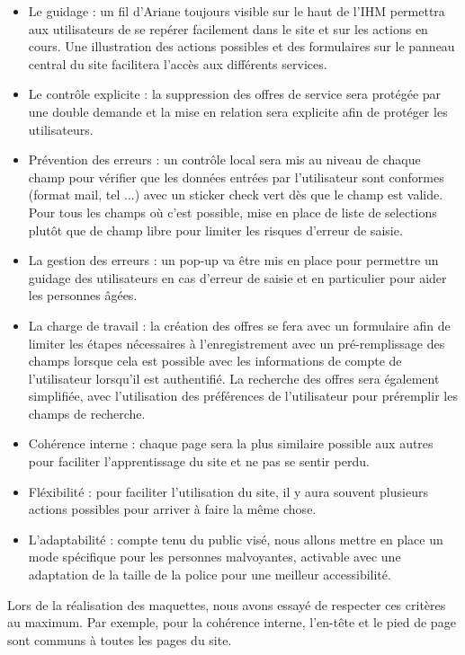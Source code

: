 \documentclass[a4paper,11pt]{article}
\begin{document}
\begin{itemize}
  \item Le guidage : un fil d’Ariane toujours visible sur le haut de l’IHM permettra aux utilisateurs de
  se repérer facilement dans le site et sur les actions en cours. Une illustration des actions
  possibles et des formulaires sur le panneau central du site facilitera l’accès aux différents
  services.
  \item Le contrôle explicite : la suppression des offres de service sera protégée par une double
  demande et la mise en relation sera explicite afin de protéger les utilisateurs.
  \item Prévention des erreurs : un contrôle local sera mis au niveau de chaque champ pour vérifier que
  les données entrées par l'utilisateur sont conformes (format mail, tel ...) avec un sticker check vert
  dès que le champ est valide. Pour tous les champs où c'est possible, mise en place de liste de selections
  plutôt que de champ libre pour limiter les risques d'erreur de saisie.
  \item La gestion des erreurs : un pop-up va être mis en place pour permettre un guidage des
  utilisateurs en cas d’erreur de saisie et en particulier pour aider les personnes âgées.
  \item La charge de travail : la création des offres se fera avec un formulaire afin de limiter les étapes
  nécessaires à l’enregistrement avec un pré-remplissage des champs lorsque cela est possible
  avec les informations de compte de l’utilisateur lorsqu’il est authentifié. La recherche des
  offres sera également simplifiée, avec l’utilisation des préférences de l’utilisateur pour
  préremplir les champs de recherche.
  \item Cohérence interne : chaque page sera la plus similaire possible aux autres pour faciliter
  l'apprentissage du site et ne pas se sentir perdu.
  \item Fléxibilité : pour faciliter l'utilisation du site, il y aura souvent plusieurs actions possibles
  pour arriver à faire la même chose.
  \item L’adaptabilité : compte tenu du public visé, nous allons mettre en place un mode spécifique
  pour les personnes malvoyantes, activable avec une adaptation de la taille de la police pour
  une meilleur accessibilité.
\end{itemize}

Lors de la réalisation des maquettes, nous avons essayé de respecter ces critères au maximum.
Par exemple, pour la cohérence interne, l’en-tête et le pied de page sont communs à toutes les pages du site.
\end{document}
